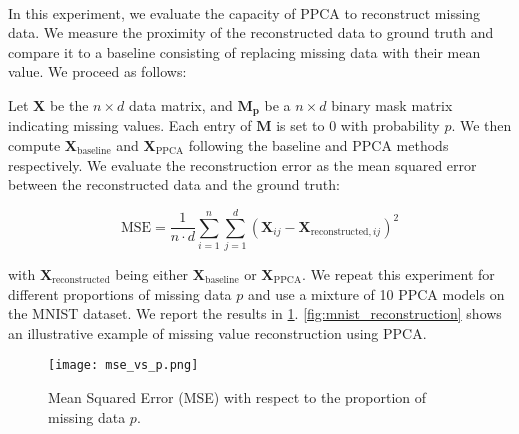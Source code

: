 \documentclass{article}
\begin{document}
\paragraph{} In this experiment, we evaluate the capacity of PPCA to reconstruct missing data. We measure the proximity of the reconstructed data to ground truth and compare it to %
a baseline consisting of replacing missing data with their mean value. We proceed as follows:




Let $\mathbf{X}$ be the $n \times d$ data matrix, and $\mathbf{M_p}$ be a $n \times d$ binary mask matrix indicating missing values. Each entry of $\mathbf{M}$ is set to $0$ with probability $p$. We then compute $\mathbf{X}_{\text{baseline}}$ and $\mathbf{X}_{\text{PPCA}}$ following the baseline and PPCA methods respectively. We evaluate the reconstruction error as the mean squared error between the reconstructed data and the ground truth:

\begin{equation}
    \label{eq:missing_data_error}
    \text{MSE} = \frac{1}{n \cdot d} \sum_{i=1}^n \sum_{j=1}^d \left(\mathbf{X}_{ij} - \mathbf{X}_{\text{reconstructed},ij}\right)^2
\end{equation}

with $\mathbf{X}_{\text{reconstructed}}$ being either $\mathbf{X}_{\text{baseline}}$ or $\mathbf{X}_{\text{PPCA}}$. We repeat this experiment for different proportions of missing data $p$ and use a mixture of 10 PPCA models on the MNIST dataset. We report the results in \cref{fig:mse_vs_p}. \cref{fig:mnist_reconstruction} shows an illustrative example of missing value reconstruction using PPCA.

\begin{figure}[h]
    \centering
    \texttt{[image: mse\_vs\_p.png]}
    \caption{Mean Squared Error (MSE) with respect to the proportion of missing data $p$.}
    \label{fig:mse_vs_p}
\end{figure}
\end{document}
